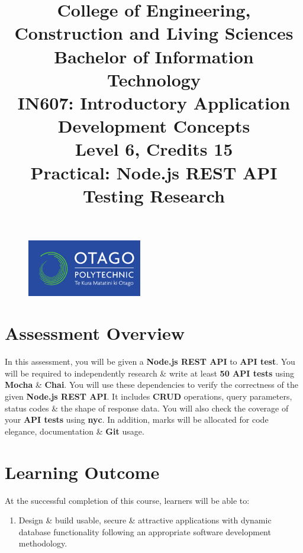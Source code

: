 \documentclass{article}
\author{}
\begin{document}
\begin{figure}
    \centering
    \includegraphics[width=50mm]{../img/logo.png}
\end{figure}

\title{College of Engineering, Construction and Living Sciences\\Bachelor of Information Technology\\IN607: Introductory Application Development Concepts\\Level 6, Credits 15\\\textbf{Practical: Node.js REST API Testing Research}}
\date{}
\maketitle

\section*{Assessment Overview}
In this assessment, you will be given a \textbf{Node.js REST API} to \textbf{API test}. You will be required to independently research \& write at least \textbf{50 API tests} using \textbf{Mocha} \& \textbf{Chai}. You will use these dependencies to verify the correctness of the given \textbf{Node.js REST API}. It includes \textbf{CRUD} operations, query parameters, status codes \& the shape of response data. You will also check the coverage of your \textbf{API tests} using \textbf{nyc}. In addition, marks will be allocated for code elegance, documentation \& \textbf{Git} usage. 

\section*{Learning Outcome}
At the successful completion of this course, learners will be able to:
\begin{enumerate}
    \item Design \& build usable, secure \& attractive applications with dynamic database functionality following an appropriate software development methodology.
\end{enumerate}
\end{document}
